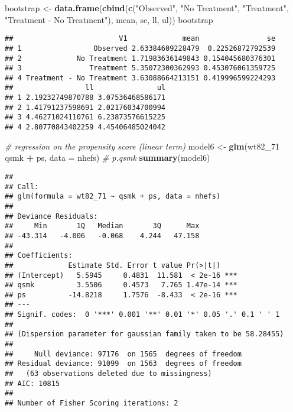 \documentclass[10pt,]{book}
\newenvironment{Shaded}{\begin{snugshade}}{\end{snugshade}}
\newcommand{\CommentTok}[1]{\textcolor[rgb]{0.56,0.35,0.01}{\textit{#1}}}
\newcommand{\DataTypeTok}[1]{\textcolor[rgb]{0.13,0.29,0.53}{#1}}
\newcommand{\DecValTok}[1]{\textcolor[rgb]{0.00,0.00,0.81}{#1}}
\newcommand{\KeywordTok}[1]{\textcolor[rgb]{0.13,0.29,0.53}{\textbf{#1}}}
\newcommand{\NormalTok}[1]{#1}
\newcommand{\OperatorTok}[1]{\textcolor[rgb]{0.81,0.36,0.00}{\textbf{#1}}}
\newcommand{\StringTok}[1]{\textcolor[rgb]{0.31,0.60,0.02}{#1}}
\begin{document}
\begin{Shaded}
\begin{Highlighting}[]
\NormalTok{bootstrap <-}\StringTok{ }\KeywordTok{data.frame}\NormalTok{(}\KeywordTok{cbind}\NormalTok{(}\KeywordTok{c}\NormalTok{(}\StringTok{"Observed"}\NormalTok{, }\StringTok{"No Treatment"}\NormalTok{, }\StringTok{"Treatment"}\NormalTok{, }
                                \StringTok{"Treatment - No Treatment"}\NormalTok{), mean, se, ll, ul))}
\NormalTok{bootstrap}
\end{Highlighting}
\end{Shaded}

\begin{verbatim}
##                         V1             mean                se
## 1                 Observed 2.63384609228479  0.22526872792539
## 2             No Treatment 1.71983636149843 0.154045680376301
## 3                Treatment 5.35072300362993 0.453076061359725
## 4 Treatment - No Treatment 3.63088664213151 0.419996599224293
##                 ll               ul
## 1 2.19232749870788 3.07536468586171
## 2 1.41791237598691 2.02176034700994
## 3 4.46271024110761 6.23873576615225
## 4 2.80770843402259 4.45406485024042
\end{verbatim}

\begin{Shaded}
\begin{Highlighting}[]
\CommentTok{# regression on the propensity score (linear term)}
\NormalTok{model6 <-}\StringTok{ }\KeywordTok{glm}\NormalTok{(wt82_}\DecValTok{71} \OperatorTok{~}\StringTok{ }\NormalTok{qsmk }\OperatorTok{+}\StringTok{ }\NormalTok{ps, }\DataTypeTok{data =}\NormalTok{ nhefs) }\CommentTok{# p.qsmk}
\KeywordTok{summary}\NormalTok{(model6)}
\end{Highlighting}
\end{Shaded}

\begin{verbatim}
## 
## Call:
## glm(formula = wt82_71 ~ qsmk + ps, data = nhefs)
## 
## Deviance Residuals: 
##     Min       1Q   Median       3Q      Max  
## -43.314   -4.006   -0.068    4.244   47.158  
## 
## Coefficients:
##             Estimate Std. Error t value Pr(>|t|)    
## (Intercept)   5.5945     0.4831  11.581  < 2e-16 ***
## qsmk          3.5506     0.4573   7.765 1.47e-14 ***
## ps          -14.8218     1.7576  -8.433  < 2e-16 ***
## ---
## Signif. codes:  0 '***' 0.001 '**' 0.01 '*' 0.05 '.' 0.1 ' ' 1
## 
## (Dispersion parameter for gaussian family taken to be 58.28455)
## 
##     Null deviance: 97176  on 1565  degrees of freedom
## Residual deviance: 91099  on 1563  degrees of freedom
##   (63 observations deleted due to missingness)
## AIC: 10815
## 
## Number of Fisher Scoring iterations: 2
\end{verbatim}
\end{document}
